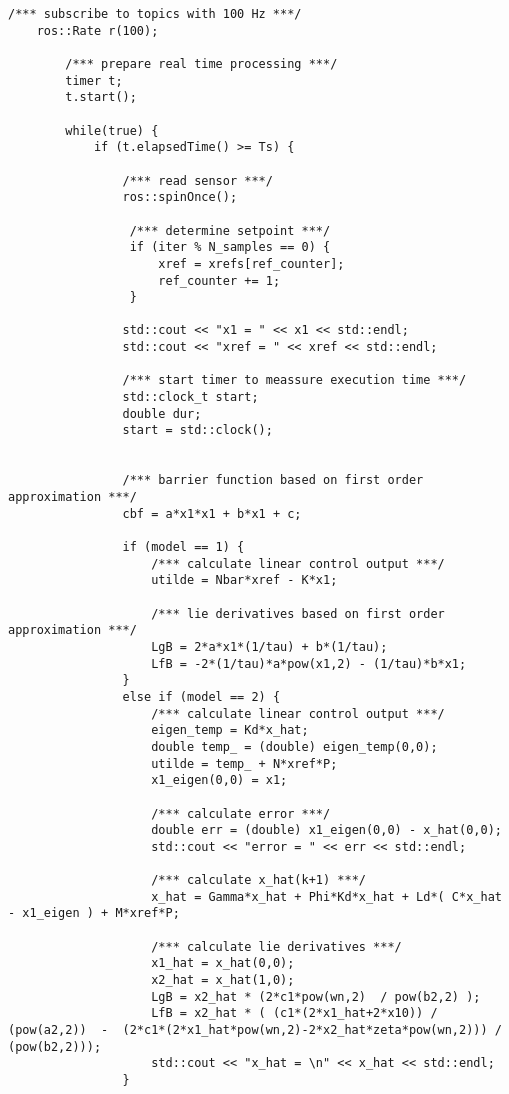 \begin{lstlisting}[language=gedit]
    /*** subscribe to topics with 100 Hz ***/
    ros::Rate r(100);

        /*** prepare real time processing ***/
        timer t;
        t.start();

        while(true) {
            if (t.elapsedTime() >= Ts) {
              
                /*** read sensor ***/ 
                ros::spinOnce();
 
                 /*** determine setpoint ***/
                 if (iter % N_samples == 0) {
                     xref = xrefs[ref_counter];
                     ref_counter += 1; 
                 }
          
                std::cout << "x1 = " << x1 << std::endl;
                std::cout << "xref = " << xref << std::endl;
 
                /*** start timer to meassure execution time ***/
                std::clock_t start;
                double dur;
                start = std::clock();               
               

                /*** barrier function based on first order approximation ***/
                cbf = a*x1*x1 + b*x1 + c;

                if (model == 1) {
                    /*** calculate linear control output ***/
                    utilde = Nbar*xref - K*x1;

                    /*** lie derivatives based on first order approximation ***/
                    LgB = 2*a*x1*(1/tau) + b*(1/tau);
                    LfB = -2*(1/tau)*a*pow(x1,2) - (1/tau)*b*x1;
                }
                else if (model == 2) {
                    /*** calculate linear control output ***/
                    eigen_temp = Kd*x_hat;
                    double temp_ = (double) eigen_temp(0,0);
                    utilde = temp_ + N*xref*P;
                    x1_eigen(0,0) = x1;

                    /*** calculate error ***/
                    double err = (double) x1_eigen(0,0) - x_hat(0,0);
                    std::cout << "error = " << err << std::endl;

                    /*** calculate x_hat(k+1) ***/
                    x_hat = Gamma*x_hat + Phi*Kd*x_hat + Ld*( C*x_hat - x1_eigen ) + M*xref*P;

                    /*** calculate lie derivatives ***/
                    x1_hat = x_hat(0,0);
                    x2_hat = x_hat(1,0);
                    LgB = x2_hat * (2*c1*pow(wn,2)  / pow(b2,2) );
                    LfB = x2_hat * ( (c1*(2*x1_hat+2*x10)) / (pow(a2,2))  -  (2*c1*(2*x1_hat*pow(wn,2)-2*x2_hat*zeta*pow(wn,2))) / (pow(b2,2)));          
                    std::cout << "x_hat = \n" << x_hat << std::endl;
                }


\end{lstlisting}
